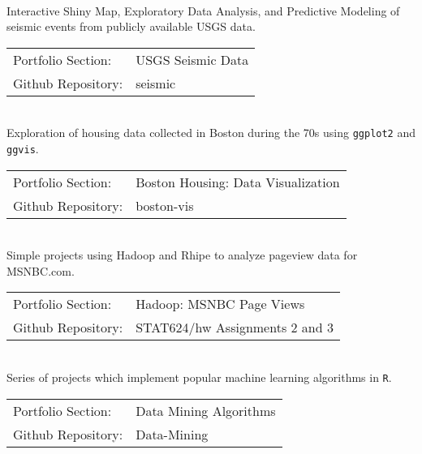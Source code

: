 \documentclass[letterpaper]{deedy-resume} %
\begin{document}
\begin{flushleft}
\\
Interactive Shiny Map, Exploratory Data Analysis, and
Predictive Modeling of seismic events from publicly available USGS
data.

\vspace{10pt}

\begin{tabular}{l  l}
  Portfolio Section: & USGS Seismic Data\\
  Github Repository: & seismic\\
\end{tabular}
\vspace{10pt}

\\
Exploration of housing data collected in Boston during the 70s using
\texttt{ggplot2} and \texttt{ggvis}.
\vspace{10pt}

\begin{tabular}{l  l}
  Portfolio Section: & Boston Housing: Data Visualization\\
  Github Repository: & boston-vis\\
\end{tabular}
\vspace{10pt}

\\
Simple projects using Hadoop and Rhipe to analyze pageview
data for MSNBC.com. 
\vspace{10pt}

\begin{tabular}{l  l}
  Portfolio Section: & Hadoop: MSNBC Page Views\\
  Github Repository: & STAT624/hw Assignments 2 and 3\\
\end{tabular}
\vspace{10pt}

\\
Series of projects which implement popular machine learning algorithms
in \texttt{R}.
\vspace{10pt}

\begin{tabular}{l  l}
  Portfolio Section: & Data Mining Algorithms\\
  Github Repository: & Data-Mining\\
\end{tabular}
\vspace{10pt}


\end{flushleft}
\end{document}
